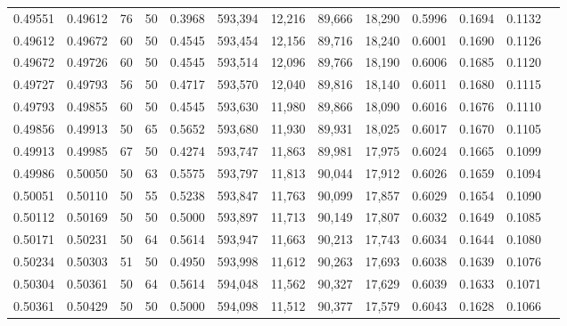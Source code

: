 \begin{tabular}{rrrrrrrrrrrrr}
0.49551 & 0.49612 &    76 &  50 &                                     0.3968 & 593,394 &  12,216 &  89,666 &  18,290 & 0.5996 & 0.1694 & 0.1132 \\
0.49612 & 0.49672 &    60 &  50 &                                     0.4545 & 593,454 &  12,156 &  89,716 &  18,240 & 0.6001 & 0.1690 & 0.1126 \\
0.49672 & 0.49726 &    60 &  50 &                                     0.4545 & 593,514 &  12,096 &  89,766 &  18,190 & 0.6006 & 0.1685 & 0.1120 \\
0.49727 & 0.49793 &    56 &  50 &                                     0.4717 & 593,570 &  12,040 &  89,816 &  18,140 & 0.6011 & 0.1680 & 0.1115 \\
0.49793 & 0.49855 &    60 &  50 &                                     0.4545 & 593,630 &  11,980 &  89,866 &  18,090 & 0.6016 & 0.1676 & 0.1110 \\
0.49856 & 0.49913 &    50 &  65 &                                     0.5652 & 593,680 &  11,930 &  89,931 &  18,025 & 0.6017 & 0.1670 & 0.1105 \\
0.49913 & 0.49985 &    67 &  50 &                                     0.4274 & 593,747 &  11,863 &  89,981 &  17,975 & 0.6024 & 0.1665 & 0.1099 \\
0.49986 & 0.50050 &    50 &  63 &                                     0.5575 & 593,797 &  11,813 &  90,044 &  17,912 & 0.6026 & 0.1659 & 0.1094 \\
0.50051 & 0.50110 &    50 &  55 &                                     0.5238 & 593,847 &  11,763 &  90,099 &  17,857 & 0.6029 & 0.1654 & 0.1090 \\
0.50112 & 0.50169 &    50 &  50 &                                     0.5000 & 593,897 &  11,713 &  90,149 &  17,807 & 0.6032 & 0.1649 & 0.1085 \\
0.50171 & 0.50231 &    50 &  64 &                                     0.5614 & 593,947 &  11,663 &  90,213 &  17,743 & 0.6034 & 0.1644 & 0.1080 \\
0.50234 & 0.50303 &    51 &  50 &                                     0.4950 & 593,998 &  11,612 &  90,263 &  17,693 & 0.6038 & 0.1639 & 0.1076 \\
0.50304 & 0.50361 &    50 &  64 &                                     0.5614 & 594,048 &  11,562 &  90,327 &  17,629 & 0.6039 & 0.1633 & 0.1071 \\
0.50361 & 0.50429 &    50 &  50 &                                     0.5000 & 594,098 &  11,512 &  90,377 &  17,579 & 0.6043 & 0.1628 & 0.1066 \\

\end{tabular}
